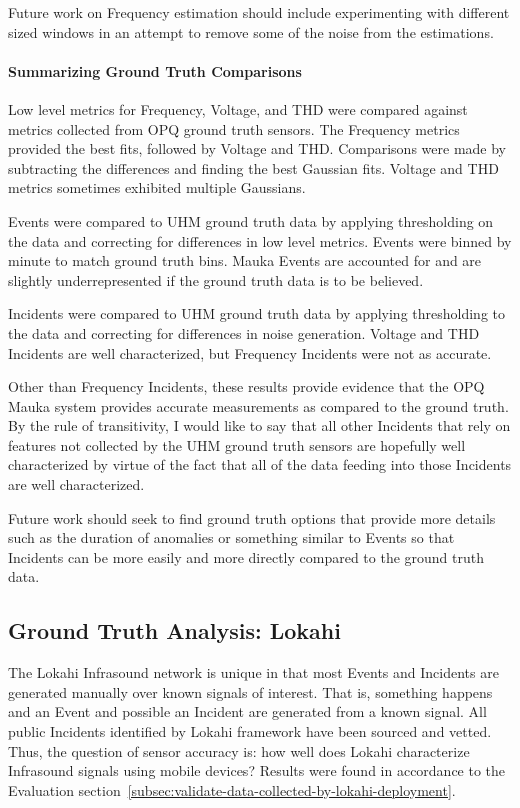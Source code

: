Future work on Frequency estimation should include experimenting with different sized windows in an attempt to remove some of the noise from the estimations.

\paragraph{Summarizing Ground Truth Comparisons}

Low level metrics for Frequency, Voltage, and THD were compared against metrics collected from OPQ ground truth sensors. The Frequency metrics provided the best fits, followed by Voltage and THD. Comparisons were made by subtracting the differences and finding the best Gaussian fits. Voltage and THD metrics sometimes exhibited multiple Gaussians.

Events were compared to UHM ground truth data by applying thresholding on the data and correcting for differences in low level metrics. Events were binned by minute to match ground truth bins. Mauka Events are accounted for and are slightly underrepresented if the ground truth data is to be believed.

Incidents were compared to UHM ground truth data by applying thresholding to the data and correcting for differences in noise generation. Voltage and THD Incidents are well characterized, but Frequency Incidents were not as accurate.

Other than Frequency Incidents, these results provide evidence that the OPQ Mauka system provides accurate measurements as compared to the ground truth. By the rule of transitivity, I would like to say that all other Incidents that rely on features not collected by the UHM ground truth sensors are hopefully well characterized by virtue of the fact that all of the data feeding into those Incidents are well characterized.

Future work should seek to find ground truth options that provide more details such as the duration of anomalies or something similar to Events so that Incidents can be more easily and more directly compared to the ground truth data.

\subsection{Ground Truth Analysis: Lokahi}\label{subsec:ground-truth-analysis:-lokahi}

The Lokahi Infrasound network is unique in that most Events and Incidents are generated manually over known signals of interest. That is, something happens and an Event and possible an Incident are generated from a known signal. All public Incidents identified by Lokahi framework have been sourced and vetted. Thus, the question of sensor accuracy is: how well does Lokahi characterize Infrasound signals using mobile devices? Results were found in accordance to the Evaluation section~\ref{subsec:validate-data-collected-by-lokahi-deployment}.

